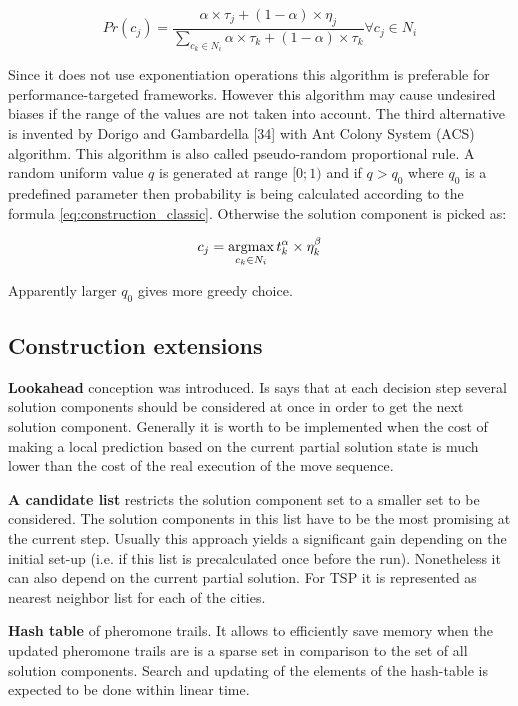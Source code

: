 \begin{equation}
Pr(c_j)=\frac{\alpha \times \tau_j + (1-\alpha) \times \eta_j}{\sum \limits_{c_k \in N_i} \alpha \times \tau_k + (1-\alpha) \times \tau_k} \forall c_j \in N_i
\end{equation}

Since it does not use exponentiation operations this algorithm is preferable for performance-targeted frameworks. However this algorithm may cause undesired biases if the range of the values are not taken into account. The third alternative is invented by Dorigo and Gambardella [34] with Ant Colony System (ACS) algorithm. This algorithm is also called pseudo-random proportional rule. A random uniform value $q$ is generated at range $[0;1)$ and if $q>q_0$ where $q_0$ is a predefined parameter then probability is being calculated according to the formula \eqref{eq:construction_classic}. Otherwise the solution component is picked as:

\begin{equation}
c_j = \operatornamewithlimits{argmax}\limits_{c_k \in N_i} t_k^\alpha \times \eta_k^\beta
\label{eq:construction_dorigo}
\end{equation}

Apparently larger $q_0$ gives more greedy choice.

\subsection{Construction extensions}

\textbf{Lookahead} conception was introduced. Is says that at each decision step several solution components should be considered at once in order to get the next solution component. Generally it is worth to be implemented when the cost of making a local prediction based on the current partial solution state is much lower than the cost of the real execution of the move sequence.

\textbf{A candidate list} restricts the solution component set to a smaller set to be considered. The solution components in this list have to be the most promising at the current step. Usually this approach yields a significant gain depending on the initial set-up (i.e. if this list is precalculated once before the run). Nonetheless it can also depend on the current partial solution. For TSP it is represented as nearest neighbor list for each of the cities.

\textbf{Hash table} of pheromone trails. It allows to efficiently save memory when the updated pheromone trails are is a sparse set in comparison to the set of all solution components. Search and updating of the elements of the hash-table is expected to be done within linear time.

